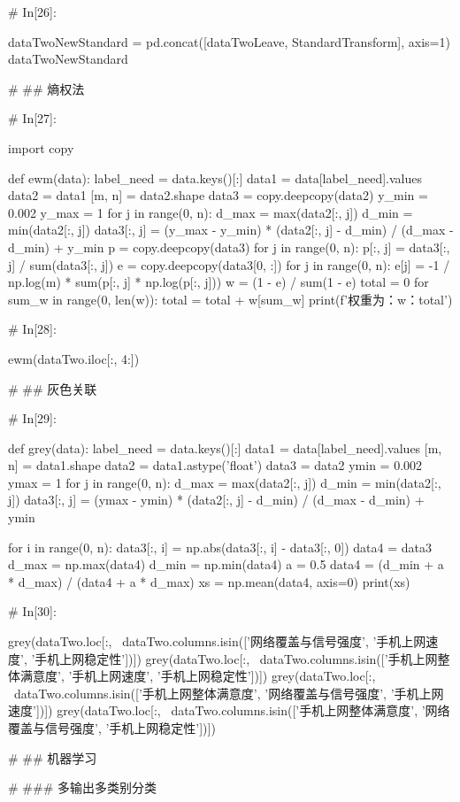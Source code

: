 \documentclass{MathorCupmodeling}
\begin{document}
\begin{python}
	# In[26]:
	
	
	dataTwoNewStandard = pd.concat([dataTwoLeave, StandardTransform], axis=1)
	dataTwoNewStandard
	
	# ## 熵权法
	
	# In[27]:
	
	
	import copy
	
	
	def ewm(data):
		label_need = data.keys()[:]
		data1 = data[label_need].values
		data2 = data1
		[m, n] = data2.shape
		data3 = copy.deepcopy(data2)
		y_min = 0.002
		y_max = 1
		for j in range(0, n):
			d_max = max(data2[:, j])
			d_min = min(data2[:, j])
			data3[:, j] = (y_max - y_min) * (data2[:, j] - d_min) / (d_max - d_min) + y_min
		p = copy.deepcopy(data3)
		for j in range(0, n):
			p[:, j] = data3[:, j] / sum(data3[:, j])
		e = copy.deepcopy(data3[0, :])
		for j in range(0, n):
			e[j] = -1 / np.log(m) * sum(p[:, j] * np.log(p[:, j]))
		w = (1 - e) / sum(1 - e)
		total = 0
		for sum_w in range(0, len(w)):
			total = total + w[sum_w]
		print(f'权重为：{w}：{total}')
	
	
	# In[28]:
	
	
	ewm(dataTwo.iloc[:, 4:])
	
	
	# ## 灰色关联
	
	# In[29]:
	
	
	def grey(data):
		label_need = data.keys()[:]
		data1 = data[label_need].values
		[m, n] = data1.shape
		data2 = data1.astype('float')
		data3 = data2
		ymin = 0.002
		ymax = 1
		for j in range(0, n):
			d_max = max(data2[:, j])
			d_min = min(data2[:, j])
			data3[:, j] = (ymax - ymin) * (data2[:, j] - d_min) / (d_max - d_min) + ymin
	
		for i in range(0, n):
			data3[:, i] = np.abs(data3[:, i] - data3[:, 0])
		data4 = data3
		d_max = np.max(data4)
		d_min = np.min(data4)
		a = 0.5
		data4 = (d_min + a * d_max) / (data4 + a * d_max)
		xs = np.mean(data4, axis=0)
		print(xs)
	
	
	# In[30]:
	
	
	grey(dataTwo.loc[:, ~dataTwo.columns.isin(['网络覆盖与信号强度', '手机上网速度', '手机上网稳定性'])])
	grey(dataTwo.loc[:, ~dataTwo.columns.isin(['手机上网整体满意度', '手机上网速度', '手机上网稳定性'])])
	grey(dataTwo.loc[:, ~dataTwo.columns.isin(['手机上网整体满意度', '网络覆盖与信号强度', '手机上网速度'])])
	grey(dataTwo.loc[:, ~dataTwo.columns.isin(['手机上网整体满意度', '网络覆盖与信号强度', '手机上网稳定性'])])
	
	# ## 机器学习
	
	# ### 多输出多类别分类
	

\end{python}
\end{document}
